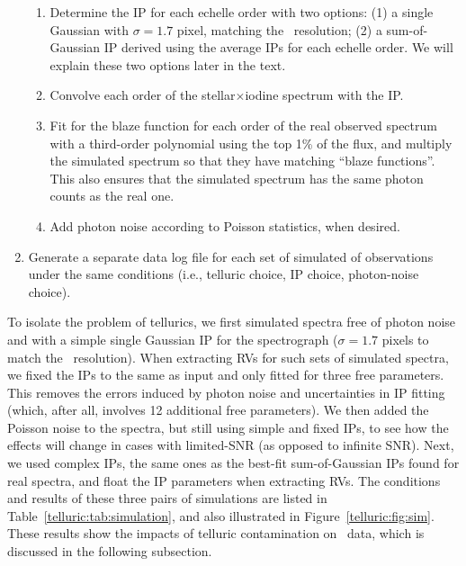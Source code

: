 \begin{enumerate}
\begin{enumerate}
  \item Determine the IP for each echelle order with two options: (1)
    a single Gaussian with $\sigma=1.7$ pixel, matching the \keck\
    resolution; (2) a sum-of-Gaussian IP derived using the average IPs for
    each echelle order. We will explain these two options later in the
    text.
  \item Convolve each order of the stellar$\times$iodine spectrum with
    the IP.
  \item Fit for the blaze function for each order of the real observed
    spectrum with a third-order polynomial using the top 1\% of the flux,
    and multiply the simulated spectrum so that they have matching ``blaze
    functions''. This also ensures that the simulated spectrum has the
    same photon counts as the real one.
  \item Add photon noise according to Poisson statistics, when
    desired.
  \end{enumerate}
\item Generate a separate data log file for each set of simulated of
  observations under the same conditions (i.e., telluric choice, IP choice,
  photon-noise choice).
\end{enumerate}

To isolate the problem of tellurics, we first simulated spectra free
of photon noise and with a simple single Gaussian IP for the
spectrograph ($\sigma = 1.7$ pixels to match the \keck\
resolution). When extracting RVs for such sets of simulated spectra,
we fixed the IPs to the same as input and only fitted for three free
parameters. This removes the errors induced by photon noise and
uncertainties in IP fitting (which, after all, involves 12 additional
free parameters). We then added the Poisson noise to the spectra, but
still using simple and fixed IPs, to see how the effects will change
in cases with limited-SNR (as opposed to infinite SNR). Next, we used
complex IPs, the same ones as the best-fit sum-of-Gaussian IPs found
for real spectra, and float the IP parameters when extracting RVs. The
conditions and results of these three pairs of simulations are listed
in Table~\ref{telluric:tab:simulation}, and also illustrated in
Figure~\ref{telluric:fig:sim}. These results show the impacts of
telluric contamination on \keck\ data, which is discussed in the
following subsection.



